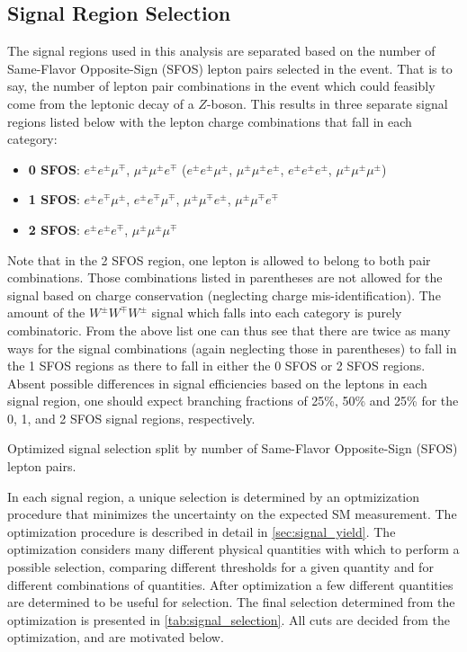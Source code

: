 \subsection{Signal Region Selection}
\label{sec:signal_regions}
The signal regions used in this analysis are separated based on the number of 
Same-Flavor Opposite-Sign (SFOS) lepton pairs selected in the event.  That is to say,
the number of lepton pair combinations in the event 
which could feasibly come from the leptonic decay of a $Z$-boson.
This results in three separate signal regions listed 
below with the lepton charge combinations
that fall in each category:
\begin{itemize}
\item \textbf{0 SFOS}: $e^{\pm}e^{\pm}\mu^{\mp}$, 
$\mu^{\pm}\mu^{\pm}e^{\mp}$ ($e^{\pm}e^{\pm}\mu^{\pm}$, 
$\mu^{\pm}\mu^{\pm}e^{\pm}$, $e^{\pm}e^{\pm}e^{\pm}$, $\mu^{\pm}\mu^{\pm}\mu^{\pm}$)
\item \textbf{1 SFOS}: $e^{\pm}e^{\mp}\mu^{\pm}$, 
$e^{\pm}e^{\mp}\mu^{\mp}$, $\mu^{\pm}\mu^{\mp}e^{\pm}$, $\mu^{\pm}\mu^{\mp}e^{\mp}$
\item \textbf{2 SFOS}: $e^{\pm}e^{\pm}e^{\mp}$, $\mu^{\pm}\mu^{\pm}\mu^{\mp}$
\end{itemize}
Note that in the 2 SFOS region, one lepton is allowed to belong to both 
pair combinations.
Those combinations listed in parentheses are not allowed for the signal based on charge conservation (neglecting charge mis-identification).  
The amount of the $W^{\pm}W^{\mp}W^{\pm}$ signal
which falls into each category is purely combinatoric.  
From the above list one can thus see that there are twice as many ways 
for the signal combinations (again neglecting those in parentheses)
to fall in the 1 SFOS regions as 
there to fall in either the 0 SFOS or 2 SFOS regions. 
Absent possible differences in signal efficiencies based on the leptons in each 
signal region, one should expect branching 
fractions of 25\%, 50\% and 25\% for the 0, 1, and 2 SFOS signal regions, respectively.


\begin{table}[ht!]
\centering
\begin{small}

\end{small}
\caption{Optimized signal selection split by number of Same-Flavor 
Opposite-Sign (SFOS) lepton pairs.}
\label{tab:signal_selection}
\end{table}

In each signal region, a unique selection is determined by an optmizization
procedure that minimizes the uncertainty on the expected SM measurement. 
The optimization procedure is described in detail in \sec\ref{sec:signal_yield}.
The optimization considers many different physical quantities 
with which to perform a possible selection, comparing different
thresholds for a given quantity and for different combinations of 
quantities. After optimization a few different quantities
are determined to be useful for selection. 
The final selection determined from the optimization
is presented in \tab\ref{tab:signal_selection}.
All cuts are decided from the optimization, and are motivated below.

